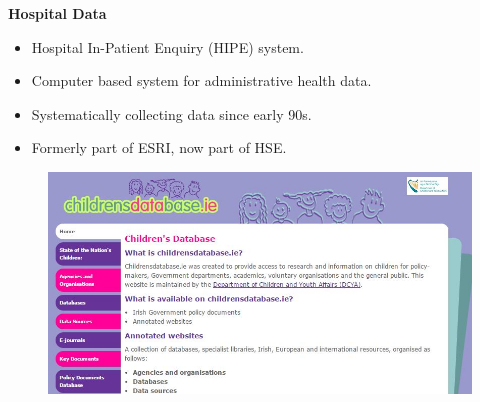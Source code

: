 \documentclass{beamer}
\begin{document}
		\begin{frame}
			\Large
			\textbf{Hospital Data}
			
			\begin{itemize}
				\item Hospital In-Patient Enquiry (HIPE) system.
				\item Computer based system for administrative health data.
				\item Systematically collecting data since early 90s.
				\item Formerly part of ESRI, now part of HSE.
			\end{itemize} 


		\end{frame}
\begin{frame}
	\begin{figure}
\centering
\includegraphics[width=1.19\linewidth]{childrensdatabase}

\end{figure}

\end{frame}
\end{document}
